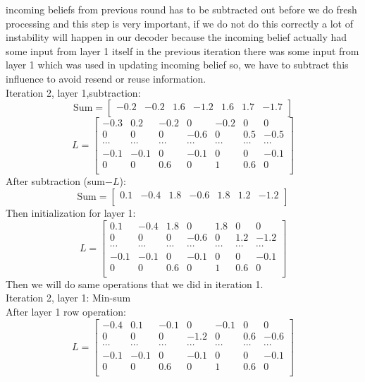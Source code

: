 incoming beliefs from previous round has to be subtracted out before we do fresh processing and this step is very important, if we do not do this correctly a lot of instability will happen in our decoder because the incoming belief actually had some input from layer 1 itself in the previous iteration there was some input from layer 1 which was used in updating incoming belief so, we have to subtract this influence to avoid resend or reuse information.\\
Iteration 2, layer 1,subtraction:
\[ \text{Sum} = [\begin{matrix}-0.2&-0.2&1.6&-1.2&1.6&1.7&-1.7\\\end{matrix}] \]
\[ L=\left[\begin{matrix}-0.3&0.2&-0.2&0&-0.2&0&0\\0&0&0&-0.6&0&0.5&-0.5\\\cdots&\cdots&\cdots&\cdots&\cdots&\cdots&\cdots\\-0.1&-0.1&0&-0.1&0&0&-0.1\\0&0&0.6&0&1&0.6&0\\\end{matrix}\right] \]
After subtraction (sum$-L$):
\[ \text{Sum} =  [\begin{matrix}0.1&-0.4&1.8&-0.6&1.8&1.2&-1.2\\\end{matrix}] \]
Then initialization for layer 1:
\[ L=\left[\begin{matrix}0.1&-0.4&1.8&0&1.8&0&0\\0&0&0&-0.6&0&1.2&-1.2\\\cdots&\cdots&\cdots&\cdots&\cdots&\cdots&\cdots\\-0.1&-0.1&0&-0.1&0&0&-0.1\\0&0&0.6&0&1&0.6&0\\\end{matrix}\right] \]
Then we will do same operations that we did in iteration 1.\\
Iteration 2, layer 1: Min-sum \\
After layer 1 row operation:
\[ L=\left[\begin{matrix}-0.4&0.1&-0.1&0&-0.1&0&0\\0&0&0&-1.2&0&0.6&-0.6\\\cdots&\cdots&\cdots&\cdots&\cdots&\cdots&\cdots\\-0.1&-0.1&0&-0.1&0&0&-0.1\\0&0&0.6&0&1&0.6&0\\\end{matrix}\right] \]
